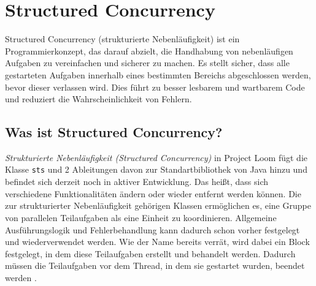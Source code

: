 \section{Structured Concurrency}                                 %
\label{sec:Structured Concurrency}

    Structured Concurrency (strukturierte Nebenläufigkeit) ist ein Programmierkonzept, das darauf abzielt, die Handhabung von nebenläufigen Aufgaben zu vereinfachen und sicherer zu machen.
    Es stellt sicher, dass alle gestarteten Aufgaben innerhalb eines bestimmten Bereichs abgeschlossen werden, bevor dieser verlassen wird.
    Dies führt zu besser lesbarem und wartbarem Code und reduziert die Wahrscheinlichkeit von Fehlern.

\subsection{Was ist Structured Concurrency?}
\label{subsec:WasistSC?}
    \emph{Strukturierte Nebenläufigkeit (Structured Concurrency)} in Project Loom fügt die Klasse \texttt{\gls{sts}} und 2 Ableitungen davon zur Standartbibliothek von Java hinzu
    und befindet sich derzeit noch in
    aktiver Entwicklung. Das heißt, dass sich verschiedene Funktionalitäten ändern oder wieder entfernt werden können.
    Die zur strukturierter Nebenläufigkeit gehörigen Klassen ermöglichen
    es, eine Gruppe von parallelen Teilaufgaben als eine Einheit zu koordinieren. Allgemeine Ausführungslogik und Fehlerbehandlung kann dadurch schon vorher festgelegt und 
    wiederverwendet werden.
    Wie der Name bereits verrät, wird dabei ein Block festgelegt, in dem diese Teilaufgaben erstellt und behandelt werden.
    Dadurch müssen die Teilaufgaben vor dem Thread, in dem sie gestartet wurden, beendet werden \cite{oracle21SC}.

